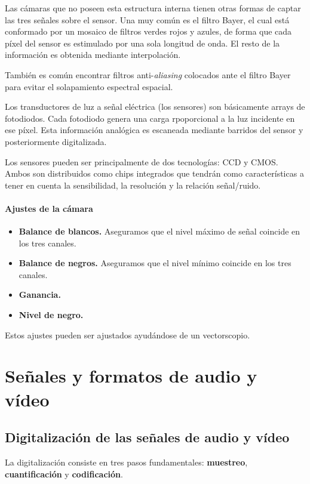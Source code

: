 \documentclass[10pt]{book}
\begin{document}
Las cámaras que no poseen esta estructura interna tienen otras formas de captar las tres señales sobre el sensor. Una muy común es el filtro Bayer, el cual está conformado por un mosaico de filtros verdes rojos y azules, de forma que cada píxel del sensor es estimulado por una sola longitud de onda. El resto de la información es obtenida mediante interpolación.

También es común encontrar filtros anti-\textit{aliasing} colocados ante el filtro Bayer para evitar el solapamiento espectral espacial.

Los transductores de luz a señal eléctrica (los sensores) son básicamente arrays de fotodiodos. Cada fotodiodo genera una carga rpoporcional a la luz incidente en ese píxel. Esta información analógica es escaneada mediante barridos del sensor y posteriormente digitalizada.

Los sensores pueden ser principalmente de dos tecnologías: CCD y CMOS. Ambos son distribuidos como chips integrados que tendrán como características a tener en cuenta la sensibilidad, la resolución y la relación señal/ruido.

\subsubsection{Ajustes de la cámara}

\begin{itemize}
  \item \textbf{Balance de blancos.} Aseguramos que el nivel máximo de señal coincide en los tres canales.
  \item \textbf{Balance de negros.} Aseguramos que el nivel mínimo coincide en los tres canales.
  \item \textbf{Ganancia.}
  \item \textbf{Nivel de negro.}
\end{itemize}

Estos ajustes pueden ser ajustados ayudándose de un vectorscopio.

\chapter{Señales y formatos de audio y vídeo}

\section{Digitalización de las señales de audio y vídeo}

La digitalización consiste en tres pasos fundamentales: \textbf{muestreo}, \textbf{cuantificación} y \textbf{codificación}.
\end{document}
